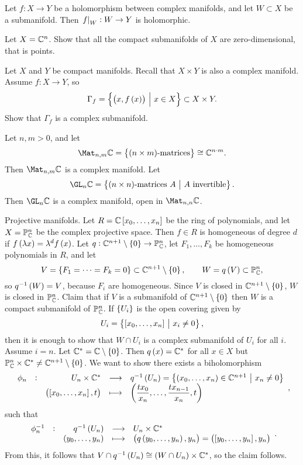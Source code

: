\begin{example}
Let $ f : X \to Y $ be a holomorphism between complex manifolds, and let $ W \subset X $ be a submanifold. Then $ \left. f \right|_W : W \to Y $ is holomorphic.
\end{example}

\begin{exercise}
Let $ X = \mathbb{C}^n $. Show that all the compact submanifolds of $ X $ are zero-dimensional, that is points.
\end{exercise}

\begin{exercise}
Let $ X $ and $ Y $ be compact manifolds. Recall that $ X \times Y $ is also a complex manifold. Assume $ f : X \to Y $, so
$$ \Gamma_f = \cbr{\br{x, f\br{x}} \st x \in X} \subset X \times Y. $$
Show that $ \Gamma_f $ is a complex submanifold.
\end{exercise}

\begin{example}
Let $ n, m > 0 $, and let
$$ \Mat_{n, m} \CC = \cbr{\text{$ \br{n \times m} $-matrices}} \cong \CC^{n \cdot m}. $$
Then $ \Mat_{n, m} \CC $ is a complex manifold. Let
$$ \GL_n \CC = \cbr{\text{$ \br{n \times n} $-matrices} \ A \st A \ \text{invertible}}. $$
Then $ \GL_n \CC $ is a complex manifold, open in $ \Mat_{n, n} \CC $.
\end{example}

\pagebreak

\begin{example}
Projective manifolds. Let $ R = \CC\sbr{x_0, \dots, x_n} $ be the ring of polynomials, and let $ X = \mathbb{P}_{\mathbb{C}}^n $ be the complex projective space. Then $ f \in R $ is homogeneous of degree $ d $ if $ f\br{\lambda x} = \lambda^df\br{x} $. Let $ q : \CC^{n + 1} \setminus \cbr{0} \to \PP_\CC^n $, let $ F_1, \dots, F_k $ be homogeneous polynomials in $ R $, and let
$$ V = \cbr{F_1 = \dots = F_k = 0} \subset \CC^{n + 1} \setminus \cbr{0}, \qquad W = q\br{V} \subset \PP_\CC^n, $$
so $ q^{-1}\br{W} = V $, because $ F_i $ are homogeneous. Since $ V $ is closed in $ \CC^{n + 1} \setminus \cbr{0} $, $ W $ is closed in $ \mathbb{P}_{\mathbb{C}}^n $. Claim that if $ V $ is a submanifold of $ \CC^{n + 1} \setminus \cbr{0} $ then $ W $ is a compact submanifold of $ \mathbb{P}_{\mathbb{C}}^n $. If $ \cbr{U_i} $ is the open covering given by
$$ U_i = \cbr{\sbr{x_0, \dots, x_n} \st x_i \ne 0}, $$
then it is enough to show that $ W \cap U_i $ is a complex submanifold of $ U_i $ for all $ i $. Assume $ i = n $. Let $ \CC^* = \CC \setminus \cbr{0} $. Then $ q\br{x} = \CC^* $ for all $ x \in X $ but $ \PP_\CC^n \times \CC^* \ne \CC^{n + 1} \setminus \cbr{0} $. We want to show there exists a biholomorphism
$$ \function[\phi_n]{U_n \times \CC^*}{q^{-1}\br{U_n} = \cbr{\br{x_0, \dots, x_n} \in \CC^{n + 1} \st x_n \ne 0}}{\br{\sbr{x_0, \dots, x_n}, t}}{\br{\dfrac{tx_0}{x_n}, \dots, \dfrac{tx_{n - 1}}{x_n}, t}}, $$
such that
$$ \function[\phi_n^{-1}]{q^{-1}\br{U_n}}{U_n \times \CC^*}{\br{y_0, \dots, y_n}}{\br{q\br{y_0, \dots, y_n}, y_n} = \br{\sbr{y_0, \dots, y_n}, y_n}}. $$
From this, it follows that $ V \cap q^{-1}\br{U_n} \cong \br{W \cap U_n} \times \CC^* $, so the claim follows.
\end{example}

